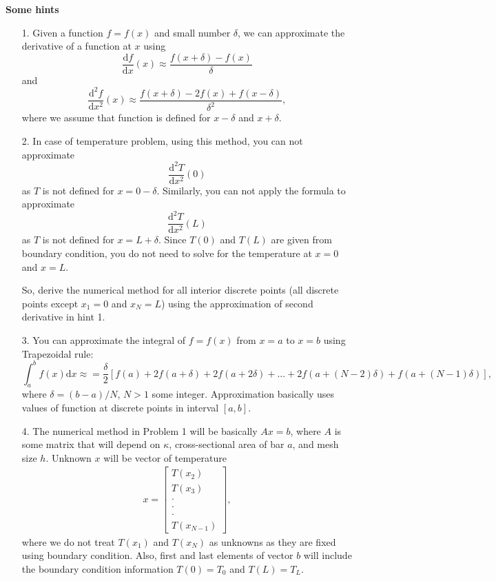 \documentclass[11pt,a4paper]{report}
\newcommand{\dd}{\mathrm{d}}
\begin{document}
\vspace{10pt}
\begin{center}
\textbf{\Large Some hints}
\end{center}
\begin{itemize}
\item[1.] Given a function $f = f(x)$ and small number $\delta$, we can approximate the derivative of a function at $x$ using
\begin{equation}
\frac{\dd f}{\dd x}(x) \approx \frac{f(x+\delta) - f(x)}{\delta}
\end{equation}
and
\begin{equation}
\frac{\dd^2 f}{\dd x^2}(x) \approx \frac{f(x+\delta) - 2f(x) + f(x - \delta)}{\delta^2},
\end{equation}
where we assume that function is defined for $x-\delta$ and $x+\delta$. 

\item[2.] In case of temperature problem, using this method, you can not approximate 
$$\frac{\dd^2 T}{\dd x^2}(0)$$
as $T$ is not defined for $x = 0 - \delta$. Similarly, you can not apply the formula to approximate
$$\frac{\dd^2 T}{\dd x^2}(L)$$
as $T$ is not defined for $x=L+\delta$. Since $T(0)$ and $T(L)$ are given from boundary condition, you do not need to solve for the temperature at $x=0$ and $x=L$. 

So, derive the numerical method for all interior discrete points (all discrete points except $x_1 = 0$ and $x_N = L$) using the approximation of second derivative in hint 1. 

\item[3.] You can approximate the integral of $f = f(x)$ from $x=a $ to $x=b$ using Trapezoidal rule:
\begin{equation}
\int_a^b f(x) \dd x \approx = \frac{\delta }{2} \left[f(a) + 2f(a+\delta) + 2f(a+2\delta) + ... + 2f(a+(N-2)\delta) + f(a+(N-1)\delta) \right],
\end{equation}
where $\delta = (b-a)/N$, $N>1$ some integer. Approximation basically uses values of function at discrete points in interval $[a, b]$. 

\item[4.] The numerical method in Problem 1 will be basically $A x = b$, where $A$ is some matrix that will depend on $\kappa$, cross-sectional area of bar $a$, and mesh size $h$. Unknown $x$ will be vector of temperature 
\begin{align}
x = \begin{bmatrix}
T(x_2) \\
T(x_3) \\
\cdot \\
\cdot \\
\cdot \\
T(x_{N-1})
\end{bmatrix},
\end{align}
where we do not treat $T(x_1)$ and $T(x_N)$ as unknowns as they are fixed using boundary condition. Also, first and last elements of vector $b$ will include the boundary condition information $T(0)  = T_0$ and $T(L) = T_L$. 
\end{itemize} 
\end{document}
